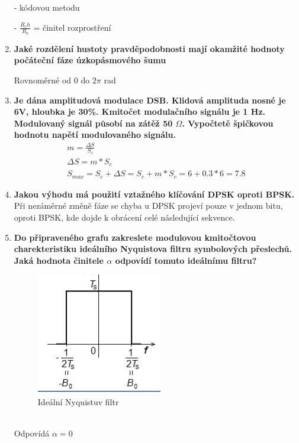 \begin{enumerate}
    - kódovou metodu
    
    - $\frac{R_ch}{R_b}$ = činitel rozprostření
    \item \textbf{Jaké rozdělení hustoty pravděpodobnosti mají okamžité hodnoty počáteční fáze úzkopásmového šumu}

    Rovnoměrné od 0 do $2\pi$ rad

    \item \textbf{Je dána amplitudová modulace DSB. Klidová amplituda nosné je 6V, hloubka je 30\%. Kmitočet modulačního signálu je 1 Hz. Modulovaný signál působí na zátěž 50 $\Omega$. Vypočtetě špičkovou hodnotu napětí modulovaného signálu. }
    \begin{gather*}
        m=\frac{\Delta S}{S_c} \\
        \Delta S =m*S_c \\
        S_{max}=S_c+\Delta S=S_c+m*S_c=6+0.3*6=7.8 
    \end{gather*}

    \item \textbf{Jakou výhodu má použití vztažného klíčování DPSK oproti BPSK.}\\
    Při nezáměrné změně fáze se chyba u DPSK projeví pouze v jednom bitu, oproti BPSK, kde dojde k obrácení celé následující sekvence.
    \item \textbf{Do připraveného grafu zakreslete modulovou kmitočtovou charekteristiku ideálního Nyquistova filtru symbolových přeslechů. Jaká hodnota činitele $\alpha$ odpovídí tomuto ideálnímu filtru?}
    \begin{figure}[h!]
        \centering
        \includegraphics{images/NyqIdeal.png}
        \caption{Ideální Nyquistuv filtr}
        \label{fig:enter-label}
    \end{figure}\\
    Odpovídá $\alpha=0$
\end{enumerate}
